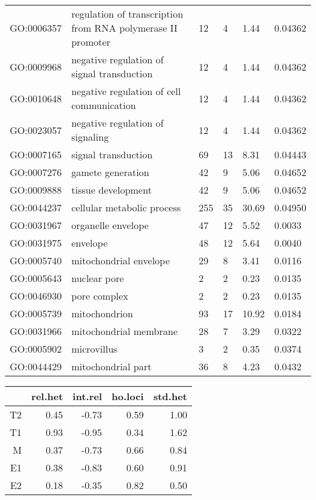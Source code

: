 \documentclass[10pt]{bmc_article}
\newenvironment{bmcformat}{\begin{raggedright}\baselineskip20pt\sloppy\setboolean{publ}{false}}{\end{raggedright}\baselineskip20pt\sloppy}
\begin{document}
\begin{bmcformat}
\begin{longtable}{lp{3cm}llll}
  GO:0006357 & regulation of transcription from RNA polymerase II promoter &  12 &   4 & 1.44 & 0.04362 \\ 
  GO:0009968 & negative regulation of signal transduction &  12 &   4 & 1.44 & 0.04362 \\ 
  GO:0010648 & negative regulation of cell communication &  12 &   4 & 1.44 & 0.04362 \\ 
  GO:0023057 & negative regulation of signaling &  12 &   4 & 1.44 & 0.04362 \\ 
  GO:0007165 & signal transduction &  69 &  13 & 8.31 & 0.04443 \\ 
  GO:0007276 & gamete generation &  42 &   9 & 5.06 & 0.04652 \\ 
  GO:0009888 & tissue development &  42 &   9 & 5.06 & 0.04652 \\ 
  GO:0044237 & cellular metabolic process & 255 &  35 & 30.69 & 0.04950 \\ 
   \hline
GO:0031967 & organelle envelope &  47 &  12 & 5.52 & 0.0033 \\ 
  GO:0031975 & envelope &  48 &  12 & 5.64 & 0.0040 \\ 
  GO:0005740 & mitochondrial envelope &  29 &   8 & 3.41 & 0.0116 \\ 
  GO:0005643 & nuclear pore &   2 &   2 & 0.23 & 0.0135 \\ 
  GO:0046930 & pore complex &   2 &   2 & 0.23 & 0.0135 \\ 
  GO:0005739 & mitochondrion &  93 &  17 & 10.92 & 0.0184 \\ 
  GO:0031966 & mitochondrial membrane &  28 &   7 & 3.29 & 0.0322 \\ 
  GO:0005902 & microvillus &   3 &   2 & 0.35 & 0.0374 \\ 
  GO:0044429 & mitochondrial part &  36 &   8 & 4.23 & 0.0432 \\ 
   \hline
\hline
\end{longtable}

\begin{table}[ht]
\begin{center}
\begin{tabular}{rrrrr}
  \hline
 & rel.het & int.rel & ho.loci & std.het \\ 
  \hline
T2 & 0.45 & -0.73 & 0.59 & 1.00 \\ 
  T1 & 0.93 & -0.95 & 0.34 & 1.62 \\ 
  M & 0.37 & -0.73 & 0.66 & 0.84 \\ 
  E1 & 0.38 & -0.83 & 0.60 & 0.91 \\ 
  E2 & 0.18 & -0.35 & 0.82 & 0.50 \\ 
   \hline
\end{tabular}
\end{center}
\end{table}
\normalsize


\end{bmcformat}
\end{document}
